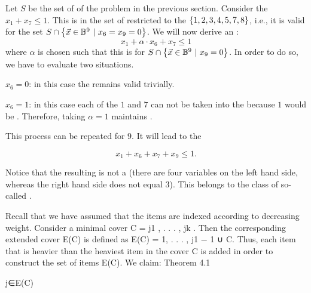 \begin{example}Let $S$ be the set of  of the problem in the previous section. Consider the  $x_1+x_7\leq1$. This  is  in the set of  restricted to the  $\left\{ 1,2,3,4,5,7,8 \right\}$, i.e., it is valid for the set $S\cap\left\{ \vec{x}\in\mathbb{B}^9\ |\ x_6=x_9=0 \right\}$. We will now derive an :
\begin{equation}
x_1+\alpha\cdot x_6+x_7\leq1
\end{equation}
where $\alpha$ is chosen such that this  is  for $S\cap\left\{ \vec{x}\in\mathbb{B}^9\ |\ x_9=0 \right\}$. In order to do so, we have to evaluate two situations.

\begin{sitenum}
 \item $x_6=0$: in this case the  remains valid trivially.
 \item $x_6=1$: in this case each of the  $1$ and $7$ can not be taken into the  because  $1$ would be . Therefore, taking $\alpha=1$ maintains .
\end{sitenum}

This process can be repeated for  $9$. It will lead to the 

\begin{equation}
x_1+x_6+x_7+x_9\leq1.
\end{equation}

Notice that the resulting  is not a  (there are four variables on the left hand side, whereas the right hand side does not equal $3$). This  belongs to the class of so-called .
\end{example}

Recall that we have assumed that the items are indexed according to decreasing weight. Consider a
minimal cover C = {j1 , . . . , jk }. Then the corresponding extended cover E(C) is defined as
E(C) = {1, . . . , j1 − 1} ∪ C.
Thus, each item that is heavier than the heaviest item in the cover C is added in order to construct the
set of items E(C). We claim:
Theorem 4.1

j∈E(C)

